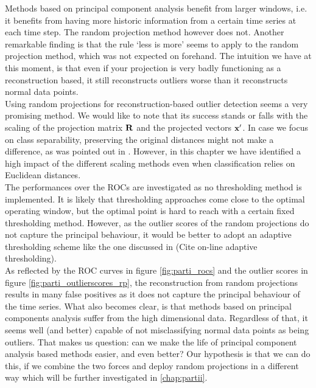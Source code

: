 Methods based on principal component analysis benefit from larger windows, i.e. it benefits from having more historic information from a certain time series at each time step. The random projection method however does not. Another remarkable finding is that the rule `less is more' seems to apply to the random projection method, which was not expected on forehand. The intuition we have at this moment, is that even if your projection is very badly functioning as a reconstruction based, it still reconstructs outliers worse than it reconstructs normal data points.\\

Using random projections for reconstruction-based outlier detection seems a very promising method. We would like to note that its success stands or falls with the scaling of the projection matrix $\bf{R}$ and the projected vectors $\bf{x}'$. In case we focus on class separability, preserving the original distances might not make a difference, as was pointed out in \cite{fradkin2003experiments}. However, in this chapter we have identified a high impact of the different scaling methods even when classification relies on Euclidean distances.\\

The performances over the ROCs are investigated as no thresholding method is implemented. It is likely that thresholding approaches come close to the optimal operating window, but the optimal point is hard to reach with a certain fixed thresholding method. However, as the outlier scores of the random projections do not capture the principal behaviour, it would be better to adopt an adaptive thresholding scheme like the one discussed in  (Cite on-line adaptive thresholding).\\

As reflected by the ROC curves in figure \ref{fig:parti_rocs} and the outlier scores in figure \ref{fig:parti_outlierscores_rp}, the reconstruction from random projections results in many false positives as it does not capture the principal behaviour of the time series. What also becomes clear, is that methods based on principal components analysis suffer from the high dimensional data.%
Regardless of that, it seems well (and better) capable of not misclassifying normal data points as being outliers. That makes us question: can we make the life of principal component analysis based methods easier, and even better? Our hypothesis is that we can do this, if we combine the two forces and deploy random projections in a different way which will be further investigated in \ref{chap:partii}.



